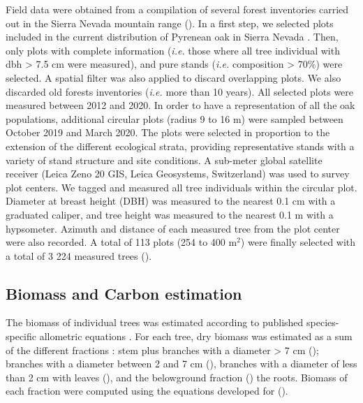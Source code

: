 Field data were obtained from a compilation of several forest inventories carried out in the Sierra Nevada mountain range (). In a first step, we selected plots included in the current distribution of Pyrenean oak in Sierra Nevada \autocite{PerezLuqueetal2019MapEcosystems}. Then, only plots with complete information (\emph{i.e.} those where all tree individual with dbh \textgreater{} 7.5 cm were measured), and pure stands (\emph{i.e.} \Qp composition \textgreater{} 70\%) were selected. A spatial filter was also applied to discard overlapping plots. We also discarded old forests inventories (\emph{i.e.} more than 10 years). All selected plots were measured between 2012 and 2020. In order to have a representation of all the oak populations, additional circular plots (radius 9 to 16 m) were sampled between October 2019 and March 2020. The plots were selected in proportion to the extension of the different ecological strata, providing representative stands with a variety of stand structure and site conditions. A sub-meter global satellite receiver (Leica Zeno 20 GIS, Leica Geosystems, Switzerland) was used to survey plot centers. We tagged and measured all tree individuals within the circular plot. Diameter at breast height (DBH) was measured to the nearest 0.1 cm with a graduated caliper, and tree height was measured to the nearest 0.1 m with a hypsometer. Azimuth and distance of each measured tree from the plot center were also recorded. A total of 113 plots (254 to 400 m$^2$) were finally selected with a total of 3 224 measured trees ().

\subsection{Biomass and Carbon estimation}\label{sec:carbon:mat-biomass}

The biomass of individual trees was estimated according to published species-specific allometric equations \autocite{RuizPeinadoetal2012BiomassModels}. For each tree, dry biomass was estimated as a sum of the different fractions \autocite{CarvalhoParresol2003AdditivityTree}: stem plus branches with a diameter \textgreater{} 7 cm (\ws); branches with a diameter between 2 and 7 cm (\wbs), branches with a diameter of less than 2 cm with leaves (\wb), and the belowground fraction (\wro) the roots. Biomass of each fraction were computed using the equations developed for \Qp \autocite{RuizPeinadoetal2012BiomassModels} ().

